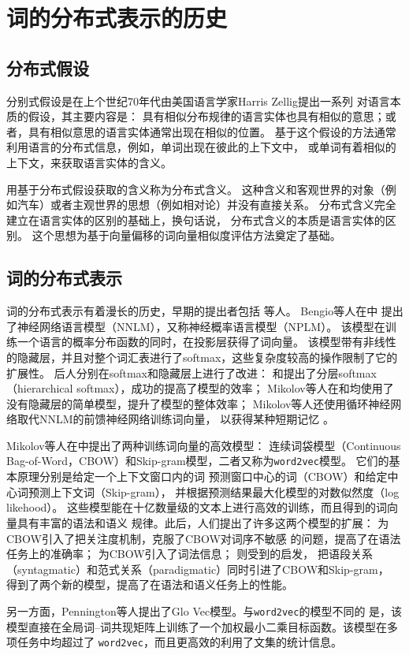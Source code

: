 \section{词的分布式表示的历史}
\label{sec:his-of-dist-rep}

\subsection{分布式假设}

分别式假设是在上个世纪70年代由美国语言学家Harris Zellig提出一系列
对语言本质的假设\cite{harris54}，其主要内容是：
具有相似分布规律的语言实体也具有相似的意思；或者，具有相似意思的语言实体通常出现在相似的位置。
基于这个假设的方法通常利用语言的分布式信息，例如，单词出现在彼此的上下文中，
或单词有着相似的上下文，来获取语言实体的含义\cite{Sahlgren2008}。

用基于分布式假设获取的含义称为分布式含义。
这种含义和客观世界的对象（例如汽车）或者主观世界的思想（例如相对论）并没有直接关系\cite{Sahlgren2008}。
分布式含义完全建立在语言实体的区别的基础上，换句话说， 分布式含义的本质是语言实体的区别。%
这个思想为基于向量偏移的词向量相似度评估方法奠定了基础。

\subsection{词的分布式表示}
词的分布式表示有着漫长的历史，早期的提出者包括
\cite{hinton:learndistrep} %
\cite{DBLP:journals/ai/Pollack90} %
\cite{DBLP:journals/jasis/DeerwesterDLFH90} %
等人。
Bengio等人在\cite{DBLP:journals/jmlr/BengioDVJ03}\cite{Bengio2006}中
提出了神经网络语言模型（NNLM），又称神经概率语言模型（NPLM）。
该模型在训练一个语言的概率分布函数的同时，在投影层获得了词向量。
该模型带有非线性的隐藏层，并且对整个词汇表进行了softmax，这些复杂度较高的操作限制了它的扩展性。
后人分别在softmax和隐藏层上进行了改进：
\cite{DBLP:conf/nips/MnihH08}和\cite{DBLP:conf/aistats/MorinB05}提出了分层softmax
（hierarchical softmax），成功的提高了模型的效率；
Mikolov等人在\cite{4960686}和\cite{DBLP:journals/corr/abs-1301-3781}均使用了没有隐藏层的简单模型，提升了模型的整体效率；
Mikolov等人还使用循环神经网络取代NNLM的前馈神经网络训练词向量，
以获得某种短期记忆
\cite{DBLP:conf/interspeech/MikolovKBCK10}
\cite{DBLP:conf/naacl/MikolovYZ13}。

Mikolov等人在\cite{DBLP:journals/corr/abs-1301-3781}中提出了两种训练词向量的高效模型：
连续词袋模型（Continuous Bag-of-Word，CBOW）和Skip-gram模型，二者又称为\texttt{word2vec}模型。
它们的基本原理分别是给定一个上下文窗口内的词
预测窗口中心的词（CBOW）和给定中心词预测上下文词（Skip-gram），
并根据预测结果最大化模型的对数似然度（log likehood）。
这些模型能在十亿数量级的文本上进行高效的训练，而且得到的词向量具有丰富的语法和语义
规律。此后，人们提出了许多这两个模型的扩展：
\cite{DBLP:conf/emnlp/LingTAFDBTL15}为CBOW引入了把关注度机制，克服了CBOW对词序不敏感
的问题，提高了在语法任务上的准确率；
\cite{DBLP:journals/tacl/BojanowskiGJM17}为CBOW引入了词法信息；
\cite{DBLP:conf/acl/SunGLXC15}则受到\cite{Sahlgren2008}的启发，
把语段关系（syntagmatic）和范式关系（paradigmatic）同时引进了CBOW和Skip-gram，
得到了两个新的模型，提高了在语法和语义任务上的性能。

另一方面，Pennington等人提出了Glo Vec模型\cite{pennington2014glove}。与\texttt{word2vec}的模型不同的
是，该模型直接在全局词--词共现矩阵上训练了一个加权最小二乘目标函数。该模型在多项任务中均超过了
\texttt{word2vec}，而且更高效的利用了文集的统计信息。


